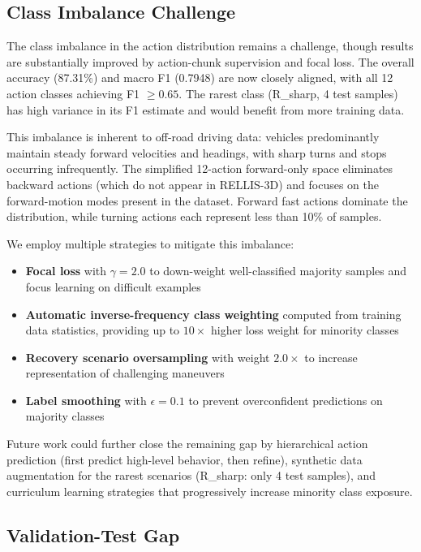 \documentclass[journal]{IEEEtran}
\begin{document}
\subsection{Class Imbalance Challenge}

The class imbalance in the action distribution remains a challenge, though results are substantially improved by action-chunk supervision and focal loss. The overall accuracy (87.31\%) and macro F1 (0.7948) are now closely aligned, with all 12 action classes achieving F1 $\geq 0.65$. The rarest class (R\_sharp, 4 test samples) has high variance in its F1 estimate and would benefit from more training data.

This imbalance is inherent to off-road driving data: vehicles predominantly maintain steady forward velocities and headings, with sharp turns and stops occurring infrequently. The simplified 12-action forward-only space eliminates backward actions (which do not appear in RELLIS-3D) and focuses on the forward-motion modes present in the dataset. Forward fast actions dominate the distribution, while turning actions each represent less than 10\% of samples.

We employ multiple strategies to mitigate this imbalance:
\begin{itemize}
    \item \textbf{Focal loss} \cite{lin2017} with $\gamma = 2.0$ to down-weight well-classified majority samples and focus learning on difficult examples
    \item \textbf{Automatic inverse-frequency class weighting} computed from training data statistics, providing up to $10\times$ higher loss weight for minority classes
    \item \textbf{Recovery scenario oversampling} with weight $2.0\times$ to increase representation of challenging maneuvers
    \item \textbf{Label smoothing} with $\epsilon = 0.1$ to prevent overconfident predictions on majority classes
\end{itemize}

Future work could further close the remaining gap by hierarchical action prediction (first predict high-level behavior, then refine), synthetic data augmentation for the rarest scenarios (R\_sharp: only 4 test samples), and curriculum learning strategies that progressively increase minority class exposure.

\subsection{Validation-Test Gap}
\end{document}
